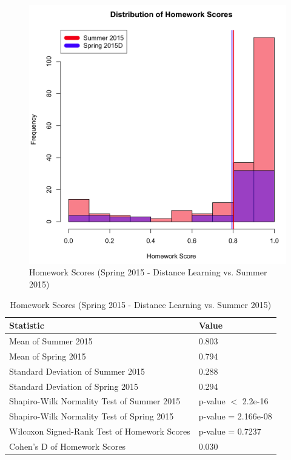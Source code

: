 \begin{figure}
	\centering
	\includegraphics[width=5in]{img/chapter4/hw_su15_vs_sp15d}
	\caption[Homework Scores (Spring 2015 - Distance Learning vs. Summer 2015)]{Homework Scores (Spring 2015 - Distance Learning vs. Summer 2015)}
  \label{fig:hwSu14Su15}
\end{figure}

\begin{small}
\begin{table}
  \centering
  \begin{tabular}{|l|l|}
    \hline
    \textbf{Statistic} & \textbf{Value} \\
	\hline
	Mean of Summer 2015 & 0.803 \\
	\hline
	Mean of Spring 2015 & 0.794 \\
	\hline
	Standard Deviation of Summer 2015 & 0.288 \\
	\hline
	Standard Deviation of Spring 2015 & 0.294 \\
	\hline
	Shapiro-Wilk Normality Test of Summer 2015 & p-value $<$ 2.2e-16 \\
	\hline
	Shapiro-Wilk Normality Test of Spring 2015 & p-value = 2.166e-08 \\
	\hline
	Wilcoxon Signed-Rank Test of Homework Scores & p-value = 0.7237 \\
	\hline
	Cohen's D of Homework Scores & 0.030 \\
	\hline
  \end{tabular}
	\caption[Homework Scores (Spring 2015 - Distance Learning vs. Summer 2015)]{Homework Scores (Spring 2015 - Distance Learning vs. Summer 2015)}
  \label{fig:hwSu14Su15}
\end{table}
\end{small}

